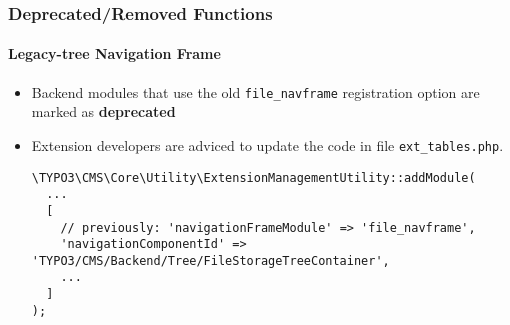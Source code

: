 %

\begin{frame}[fragile]
	\frametitle{Deprecated/Removed Functions}
	\framesubtitle{Legacy-tree Navigation Frame}


	\begin{itemize}
		\item Backend modules that use the old \texttt{file\_navframe}
			registration option are marked as \textbf{deprecated}
		\item Extension developers are adviced to update the code in file
			\texttt{ext\_tables.php}.
\begin{lstlisting}
\TYPO3\CMS\Core\Utility\ExtensionManagementUtility::addModule(
  ...
  [
    // previously: 'navigationFrameModule' => 'file_navframe',
    'navigationComponentId' => 'TYPO3/CMS/Backend/Tree/FileStorageTreeContainer',
    ...
  ]
);
\end{lstlisting}
	\end{itemize}

\end{frame}

